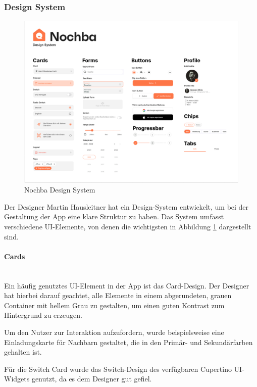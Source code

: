 \subsubsection{Design System}
\begin{figure}[h]
  \centering
  \includegraphics[width=1\textwidth]{pics/design-system.png}
  \caption{Nochba Design System}
  \label{fig:design-system}
\end{figure}

Der Designer Martin Hausleitner hat ein Design-System
entwickelt, um bei der Gestaltung der App eine klare
Struktur zu haben. Das System umfasst verschiedene
UI-Elemente, von denen die wichtigsten in Abbildung
\ref{fig:design-system} dargestellt sind.

\paragraph{Cards}\mbox{} \\

Ein häufig genutztes UI-Element in der App ist das Card-Design. Der Designer hat hierbei darauf geachtet, alle Elemente in einem abgerundeten, grauen Container mit hellem Grau zu gestalten, um einen guten Kontrast zum Hintergrund zu erzeugen.

Um den Nutzer zur Interaktion aufzufordern, wurde beispielsweise eine Einladungskarte für Nachbarn gestaltet, die in den Primär- und Sekundärfarben gehalten ist.

Für die Switch Card wurde das Switch-Design des verfügbaren Cupertino UI-Widgets genutzt, da es dem Designer gut gefiel.

